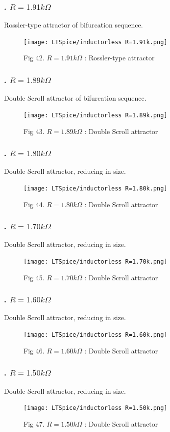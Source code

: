 \documentclass[12pt]{article}
\begin{document}
\subsubsection*{. $R=1.91k\Omega$}
Rossler-type attractor of bifurcation sequence.
\begin{figure}[H] %
	\centering
	\texttt{[image: LTSpice/inductorless R=1.91k.png]}
	\caption{Fig 42. $R=1.91k\Omega$ : Rossler-type attractor}
\end{figure}
\subsubsection*{. $R=1.89k\Omega$}
Double Scroll attractor of bifurcation sequence.
\begin{figure}[H] %
	\centering
	\texttt{[image: LTSpice/inductorless R=1.89k.png]}
	\caption{Fig 43. $R=1.89k\Omega$ : Double Scroll attractor}
\end{figure}
\subsubsection*{. $R=1.80k\Omega$}
Double Scroll attractor, reducing in size.
\begin{figure}[H] %
	\centering
	\texttt{[image: LTSpice/inductorless R=1.80k.png]}
	\caption{Fig 44. $R=1.80k\Omega$ : Double Scroll attractor}
\end{figure}
\subsubsection*{. $R=1.70k\Omega$}
Double Scroll attractor, reducing in size.
\begin{figure}[H] %
	\centering
	\texttt{[image: LTSpice/inductorless R=1.70k.png]}
	\caption{Fig 45. $R=1.70k\Omega$ : Double Scroll attractor}
\end{figure}
\subsubsection*{. $R=1.60k\Omega$}
Double Scroll attractor, reducing in size.
\begin{figure}[H] %
	\centering
	\texttt{[image: LTSpice/inductorless R=1.60k.png]}
	\caption{Fig 46. $R=1.60k\Omega$ : Double Scroll attractor}
\end{figure}
\subsubsection*{. $R=1.50k\Omega$}
Double Scroll attractor, reducing in size.
\begin{figure}[H] %
	\centering
	\texttt{[image: LTSpice/inductorless R=1.50k.png]}
	\caption{Fig 47. $R=1.50k\Omega$ : Double Scroll attractor}
\end{figure}
\end{document}
